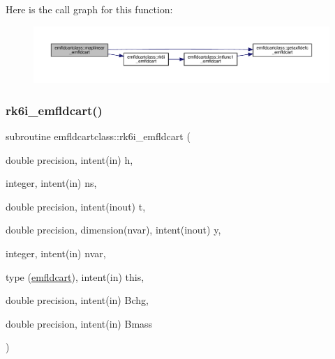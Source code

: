 Here is the call graph for this function\+:\nopagebreak
\begin{figure}[H]
\begin{center}
\leavevmode
\includegraphics[width=350pt]{namespaceemfldcartclass_a4be4286a2e0f37f64d5fd1973fe73f39_cgraph}
\end{center}
\end{figure}
\mbox{\label{namespaceemfldcartclass_a2d6f42bcd880ec225920c8179e292af6}} 
\subsubsection{\texorpdfstring{rk6i\_emfldcart()}{rk6i\_emfldcart()}}
{\footnotesize\ttfamily subroutine emfldcartclass\+::rk6i\+\_\+emfldcart (\begin{DoxyParamCaption}\item[{double precision, intent(in)}]{h,  }\item[{integer, intent(in)}]{ns,  }\item[{double precision, intent(inout)}]{t,  }\item[{double precision, dimension(nvar), intent(inout)}]{y,  }\item[{integer, intent(in)}]{nvar,  }\item[{type (\mbox{\hyperlink{namespaceemfldcartclass_structemfldcartclass_1_1emfldcart}{emfldcart}}), intent(in)}]{this,  }\item[{double precision, intent(in)}]{Bchg,  }\item[{double precision, intent(in)}]{Bmass }\end{DoxyParamCaption})}

